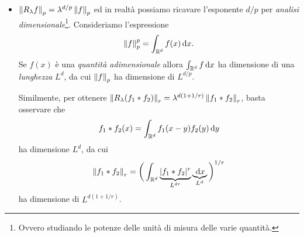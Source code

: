 \begin{itemize}
	\item
		$\left\lVert R_\lambda f \right\rVert_p = \lambda^{d / p} \left\lVert f \right\rVert_p$ ed in realtà possiamo ricavare l'esponente $d / p$ per \textit{analisi dimensionale}\footnote{Ovvero studiando le potenze delle unità di misura delle varie quantità.}.
        Consideriamo l'espressione
		$$
		\left\lVert f \right\rVert_p^p = \int_{\mathbb R^d} f(x) \,\mathrm{d} x.
		$$
		Se $f(x)$ è una \textit{quantità adimensionale} allora $\int_{\mathbb R^d} f \,\mathrm{d} x$ ha dimensione di una \textit{lunghezza} $L^d$, da cui $\left\lVert f \right\rVert_p$ ha dimensione di $L^{d / p}$.

		Similmente, per ottenere $\left\lVert R_\lambda(f_1 \ast f_2) \right\rVert_r = \lambda^{d(1 + 1 / r)} \left\lVert f_1 \ast f_2 \right\rVert_r$, basta osservare che
		$$
		f_1 \ast f_2 (x) = \int_{\mathbb R^d} f_1(x - y) f_2(y) \,\mathrm{d} y
		$$
		ha dimensione $L^d$, da cui
		$$
		\left\lVert f_1 \ast f_2 \right\rVert_r = \bigg( \int_{\mathbb R^d} \underbrace{|f_1 \ast f_2|^r}_{L^{dr}} \underbrace{\,\mathrm{d} x}_{L^d} \bigg)^{1 / r}
		$$
		ha dimensione di $L^{d(1 + 1/r)}$.
\end{itemize}

